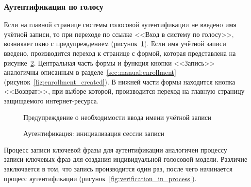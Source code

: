 \subsubsection{Аутентификация по голосу}
\label{sec:manual:verification}


Если на главной странице системы голосовой аутентификации не введено имя учётной записи, то при переходе по  ссылке <<Вход в систему по голосу>>, возникает окно с предупреждением (рисунок~\ref{fig:warning_need_login}). Если имя учётной записи введено, производится переход к странице с формой, которая представлена на рисунке~\ref{fig:verification_created}. Центральная часть формы и функция кнопки <<Запись>> аналогичны описанным в разделе~\ref{sec:manual:enrollment} (рисунок~\ref{fig:enrollment_created}). В нижней части формы находится кнопка <<Возврат>>, при выборе которой, производится переход на главную страницу защищаемого интернет-ресурса.


\begin{figure}[hbt!]
\caption{Предупреждение о необходимости ввода имени учётной записи}
\label{fig:warning_need_login}
\end{figure}


\begin{figure}[hbt!]
\caption{Аутентификация: инициализация сессии записи}
\label{fig:verification_created}
\end{figure}

Процесс записи ключевой фразы для аутентификации аналогичен процессу записи ключевых фраз для создания индивидуальной голосовой модели. Различие заключается в том, что запись производится один раз, после чего начинается процесс аутентификации (рисунок~\ref{fig:verification_in_process}). 


